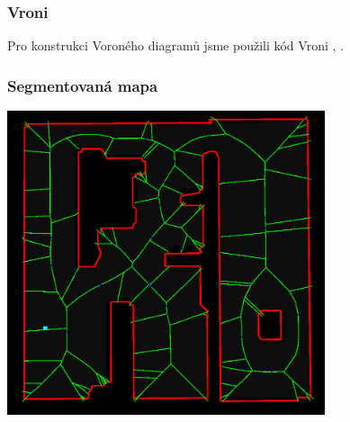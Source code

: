 \documentclass[notes=false,pdftex]{beamer}
\begin{document}

\begin{frame}
	\frametitle{Vroni}

	Pro konstrukci Voroného diagramů jsme použili kód Vroni \cite{VroniCode}, \cite{Held200195}.

\end{frame}


\begin{frame}
	\frametitle{Segmentovaná mapa}
		\begin{center}	
		\includegraphics[width=0.7\textwidth]{images/map.png} 
		\end{center}
\end{frame}

\end{document}
